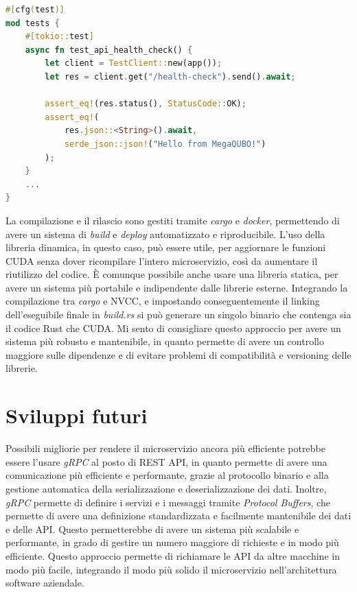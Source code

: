 \vspace{5mm}
\begin{lstlisting}[language=rust, caption=Health check test, label=lis:health_check]
#[cfg(test)]
mod tests {
    #[tokio::test]
    async fn test_api_health_check() {
        let client = TestClient::new(app());
        let res = client.get("/health-check").send().await;

        assert_eq!(res.status(), StatusCode::OK);
        assert_eq!(
            res.json::<String>().await,
            serde_json::json!("Hello from MegaQUBO!")
        );
    }
    ...
}
\end{lstlisting}
\vspace{5mm}



La compilazione e il rilascio sono gestiti tramite \textit{cargo} e \textit{docker}, permettendo di avere un sistema di \textit{build} e \textit{deploy} automatizzato e riproducibile. L'uso della libreria dinamica, in questo caso, può essere utile, per aggiornare le funzioni \gls{CUDA} senza dover ricompilare l'intero microservizio, così da aumentare il riutilizzo del codice. È comunque possibile anche usare una libreria statica, per avere un sistema più portabile e indipendente dalle librerie esterne. Integrando la compilazione tra \textit{cargo} e \gls{NVCC}, e impostando conseguentemente il linking dell'eseguibile finale in \textit{build.rs} si può generare un singolo binario che contenga sia il codice Rust che \gls{CUDA}. Mi sento di consigliare questo approccio per avere un sistema più robusto e mantenibile, in quanto permette di avere un controllo maggiore sulle dipendenze e di evitare problemi di compatibilità e versioning delle librerie.

\section{Sviluppi futuri}



Possibili migliorie per rendere il microservizio ancora più efficiente potrebbe essere l'usare \textit{gRPC} al posto di REST \gls{API}, in quanto permette di avere una comunicazione più efficiente e performante, grazie al protocollo binario e alla gestione automatica della serializzazione e deserializzazione dei dati. Inoltre, \textit{gRPC} permette di definire i servizi e i messaggi tramite \textit{Protocol Buffers}, che permette di avere una definizione standardizzata e facilmente mantenibile dei dati e delle \gls{API}. Questo permetterebbe di avere un sistema più scalabile e performante, in grado di gestire un numero maggiore di richieste e in modo più efficiente. Questo approccio permette di richiamare le \gls{API} da altre macchine in modo più facile, integrando il modo più solido il microservizio nell'architettura software aziendale.


